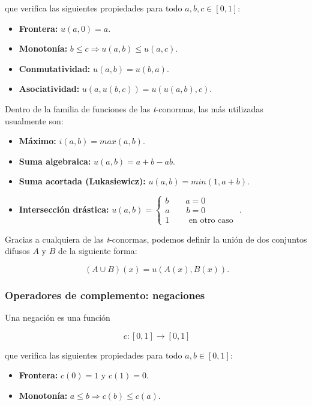 que verifica las siguientes propiedades para todo $a,b,c \in [0,1]$:

\begin{itemize}
\item \textbf{Frontera:} $u(a,0) = a$.
\item \textbf{Monotonía:} $b \leq c \Rightarrow u(a,b) \leq u(a,c)$.
\item \textbf{Conmutatividad:} $u(a,b) = u(b,a)$.
\item \textbf{Asociatividad:} $u(a,u(b,c)) = u(u(a,b),c)$.
\end{itemize}

Dentro de la familia de funciones de las \textit{t}-conormas, las más utilizadas usualmente son:

\begin{itemize}
\item \textbf{Máximo:} $i(a,b)= max(a,b)$.
\item \textbf{Suma algebraica:} $u(a,b)= a+b-ab$.
\item \textbf{Suma acortada (Lukasiewicz):} $u(a,b)= min(1,a+b)$.
\item \textbf{Intersección drástica:} $u(a,b)= \left\lbrace
  \begin{array}{l}
     b \qquad a = 0 \\
     a \qquad b = 0 \\
     1 \qquad \textrm{ en otro caso }
  \end{array}
  \right.$.
\end{itemize}

Gracias a cualquiera de las \textit{t}-conormas, podemos definir la unión de dos conjuntos difusos $A$ y $B$ de la siguiente forma:

\[
\ (A \cup B)(x)= u(A(x),B(x)).
\]

\subsubsection{Operadores de complemento: negaciones}

Una negación es una función

\[
\ c: [0,1] \longrightarrow [0,1]
\]

que verifica las siguientes propiedades para todo $a,b \in [0,1]$:
\begin{itemize}
\item \textbf{Frontera:} $c(0) = 1$ y $c(1) = 0$.
\item \textbf{Monotonía:} $a \leq b \Rightarrow c(b) \leq c(a)$.
\end{itemize}


